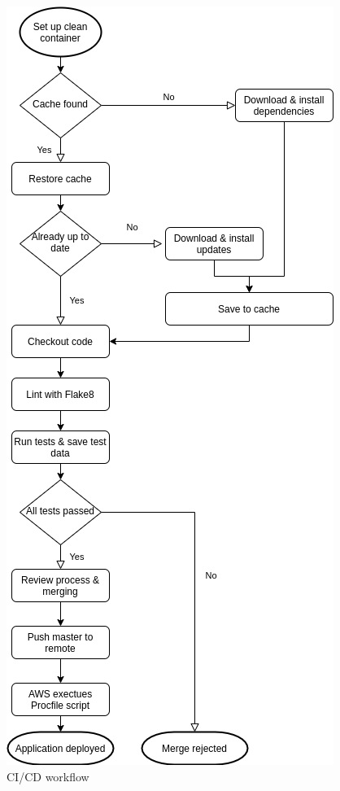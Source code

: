 \documentclass[main.tex]{subfiles}
\begin{document}
 \begin{figure}[H]
   \centering
   \includegraphics[scale=0.6]{05Coding/05Pictures/CI_CD.png}
   \caption{CI/CD workflow}
   \label{CI_CD}
\end{figure}
\end{document}

